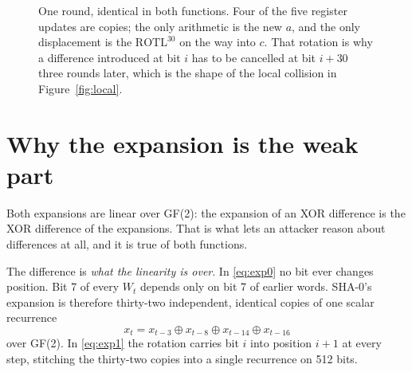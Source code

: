 \documentclass[11pt,a4paper]{article}
\newcommand{\rotl}{\ensuremath{\mathrm{ROTL}}}
\begin{document}
\begin{figure}[t]
\centering
{}
\caption{One round, identical in both functions. Four of the five register
updates are copies; the only arithmetic is the new $a$, and the only
displacement is the $\rotl^{30}$ on the way into $c$. That rotation is why a
difference introduced at bit $i$ has to be cancelled at bit $i+30$ three
rounds later, which is the shape of the local collision in
Figure~\ref{fig:local}.}
\label{fig:round}
\end{figure}

\section{Why the expansion is the weak part}\label{sec:expansion}

Both expansions are linear over GF(2): the expansion of an XOR difference is
the XOR difference of the expansions. That is what lets an attacker reason
about differences at all, and it is true of both functions.

The difference is \emph{what the linearity is over}. In
\eqref{eq:exp0} no bit ever changes position. Bit 7 of every $W_t$ depends
only on bit 7 of earlier words. SHA-0's expansion is therefore thirty-two
independent, identical copies of one scalar recurrence
%
\begin{equation}
  x_t = x_{t-3} \oplus x_{t-8} \oplus x_{t-14} \oplus x_{t-16}
  \label{eq:scalar}
\end{equation}
%
over GF(2). In \eqref{eq:exp1} the rotation carries bit $i$ into position
$i+1$ at every step, stitching the thirty-two copies into a single recurrence
on 512 bits.
\end{document}
